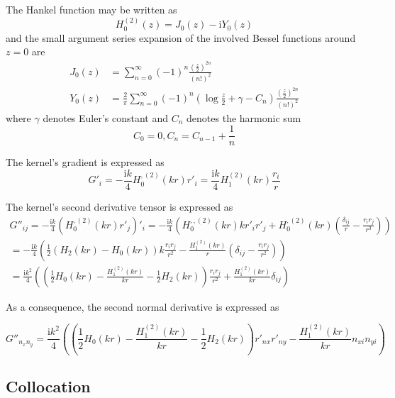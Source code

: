 \documentclass[a4paper,11pt]{article}
\newcommand{\ti}{\mathrm{i}}
\begin{document}
The Hankel function may be written as
%
\begin{equation}
	H_0^{(2)}(z) = J_0(z) - \ti Y_0(z)
\end{equation}
%
and the small argument series expansion of the involved Bessel functions around $z=0$ are
%
\begin{align}
	J_0(z) &= \sum_{n=0}^{\infty} (-1)^n \frac{\left(\frac{z}{2}\right)^{2n}}{\left(n!\right)^2} \\
	Y_0(z) &= \frac{2}{\pi}
	\sum_{n=0}^{\infty} (-1)^n \left(\log \frac{z}{2} + \gamma - C_n \right) \frac{\left(\frac{z}{2}\right)^{2n}}{\left(n!\right)^2}
\end{align}
%
where $\gamma$ denotes Euler's constant and $C_n$ denotes the harmonic sum
%
\begin{equation}
	C_0 = 0, C_n = C_{n-1} + \frac{1}{n}
\end{equation}

The kernel's gradient is expressed as
%
\begin{equation}
	G'_i = -\frac{\ti k}{4} H_0^{,(2)}(kr) r'_i
	= \frac{\ti k}{4} H_1^{(2)}(kr) \frac{r_i}{r}
\end{equation}


The kernel's second derivative tensor is expressed as
%
\begin{multline}
	G''_{ij}
	= -\frac{\ti k}{4} \left( H_0^{,(2)}(kr) r'_j \right)'_i
	= -\frac{\ti k}{4} \left( H_0^{,,(2)}(kr) k r'_i r'_j + H_0^{,(2)}(kr) \left(\frac{\delta_{ij}}{r} - \frac{r_i r_j}{r^3}\right)\right) \\
	= -\frac{\ti k}{4} \left( \frac{1}{2} \left(H_2(kr) - H_0(kr) \right) k \frac{r_i r_j}{r^2} - \frac{H_1^{(2)}(kr)}{r} \left(\delta_{ij} - \frac{r_i r_j}{r^2}\right)\right) \\
	= \frac{\ti k^2}{4} \left( \left( \frac{1}{2} H_0(kr) - \frac{H_1^{(2)}(kr)}{kr} -\frac{1}{2} H_2(kr) \right) \frac{r_i r_j}{r^2} + \frac{H_1^{(2)}(kr)}{kr} \delta_{ij} \right)
\end{multline}

As a consequence, the second normal derivative is expressed as

\begin{equation}
	G''_{n_{x} n_{y}}
	= \frac{\ti k^2}{4} \left( \left( \frac{1}{2} H_0(kr) - \frac{H_1^{(2)}(kr)}{kr} -\frac{1}{2} H_2(kr) \right)
	r'_{nx} r'_{ny}
	- \frac{H_1^{(2)}(kr)}{kr} n_{xi} n_{yi}\right)
\end{equation}


\subsection{Collocation}
\end{document}
